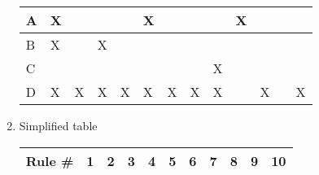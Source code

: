 \documentclass[12pt, letterpaper, titlepage]{article}
\begin{document}
\begin{enumerate}
\begin{tabular}{|l|l|l|l|l|l|l|l|l|l|l|l|l|}
    A                                                    & X             &               &               &               & X                                                                             &                                                                              &                                                                              &                                                                              & X                &                  &                  &                  \\ \hline
    B                                                    & X             &               & X             &               &                                                                               &                                                                              &                                                                              &                                                                              &                  &                  &                  &                  \\ \hline
    C                                                    &               &               &               &               &                                                                               &                                                                              &                                                                              & X                                                                            &                  &                  &                  &                  \\ \hline
    D                                                    & X             & X             & X             & X             & X                                                                             & X                                                                            & X                                                                            & X                                                                            &                  & X                &                  & X                \\ \hline
    \end{tabular}
    \item Simplified table \\
    \begin{tabular}{|l|l|l|l|l|l|l|l|l|l|l|}
        \hline
        Rule \#                                             & 1             & 2 & 3             & 4             & 5                                                                           & 6                                                                           & 7                                                                           & 8                & 9                & 10               \\ \hline

\end{tabular}
\end{enumerate}
\end{document}
